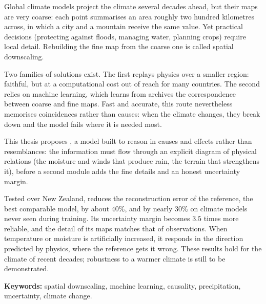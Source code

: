 \let\oldprintchaptertitle=\printchaptertitle
\renewcommand{\printchaptertitle}[1]{%
	\vspace*{-75pt}
	\oldprintchaptertitle{#1}
}%
\let\printchaptertitle=\oldprintchaptertitle

Global climate models project the climate several decades ahead, but their maps are very coarse: each point summarises an area roughly two hundred kilometres across, in which a city and a mountain receive the same value. Yet practical decisions (protecting against floods, managing water, planning crops) require local detail. Rebuilding the fine map from the coarse one is called spatial downscaling.

Two families of solutions exist. The first replays physics over a smaller region: faithful, but at a computational cost out of reach for many countries. The second relies on machine learning, which learns from archives the correspondence between coarse and fine maps. Fast and accurate, this route nevertheless memorises coincidences rather than causes: when the climate changes, they break down and the model fails where it is needed most.

This thesis proposes \Oracle{}, a model built to reason in causes and effects rather than resemblances: the information must flow through an explicit diagram of physical relations (the moisture and winds that produce rain, the terrain that strengthens it), before a second module adds the fine details and an honest uncertainty margin.

Tested over New Zealand, \Oracle{} reduces the reconstruction error of the reference, the best comparable model, by about $40\%$, and by nearly $30\%$ on climate models never seen during training. Its uncertainty margin becomes $3.5$ times more reliable, and the detail of its maps matches that of observations. When temperature or moisture is artificially increased, it responds in the direction predicted by physics, where the reference gets it wrong. These results hold for the climate of recent decades; robustness to a warmer climate is still to be demonstrated.

\vspace{0.3em}
\noindent\textbf{Keywords:} spatial downscaling, machine learning, causality, precipitation, uncertainty, climate change.

\myCleanStarChapterEnd
